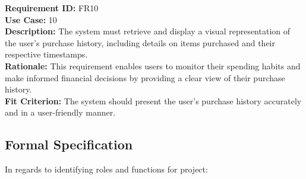 \documentclass[12pt]{article}
\begin{document}
\medskip
\noindent \textbf{Requirement ID:} FR10\\
\textbf{Use Case:} 10\\
\textbf{Description:} The system must retrieve and display a visual representation of the user's purchase history, including details on items purchased and their respective timestamps.\\
\textbf{Rationale:} This requirement enables users to monitor their spending habits and make informed financial decisions by providing a clear view of their purchase history.\\
\textbf{Fit Criterion:} The system should present the user's purchase history accurately and in a user-friendly manner.\\

\subsection{Formal Specification}
In regards to identifying roles and functions for project:
\end{document}
